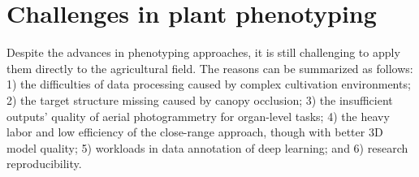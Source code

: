 


\section{Challenges in plant phenotyping}

Despite the advances in phenotyping approaches, it is still challenging to apply them directly to the agricultural field. The reasons can be summarized as follows: 
1) the difficulties of data processing caused by complex cultivation environments; 
2) the target structure missing caused by canopy occlusion; 
3) the insufficient outputs' quality of aerial photogrammetry for organ-level tasks; 
4) the heavy labor and low efficiency of the close-range approach, though with better 3D model quality;
5) workloads in data annotation of deep learning; 
and 6) research reproducibility.


